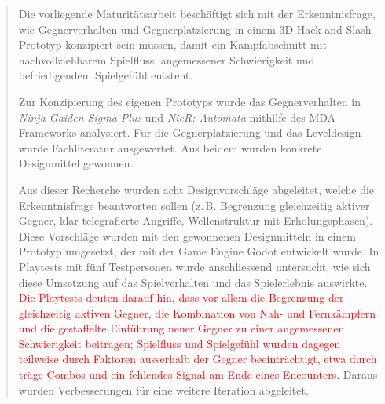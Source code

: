 \documentclass[10pt]{article}
\newcommand{\game}[1]{\textit{#1}}   %
\begin{document}
\begin{abstract}
    Die vorliegende Maturitätsarbeit beschäftigt sich mit der Erkenntnisfrage, wie Gegnerverhalten und Gegnerplatzierung in einem 3D-Hack-and-Slash-Prototyp konzipiert sein müssen, damit ein Kampfabschnitt mit nachvollziehbarem Spielfluss, angemessener Schwierigkeit und befriedigendem Spielgefühl entsteht.

    Zur Konzipierung des eigenen Prototyps wurde das Gegnerverhalten in \game{Ninja Gaiden Sigma Plus} und \game{NieR: Automata} mithilfe des MDA-Frameworks analysiert. Für die Gegnerplatzierung und das Leveldesign wurde Fachliteratur ausgewertet. Aus beidem wurden konkrete Designmittel gewonnen.

    Aus dieser Recherche wurden acht Designvorschläge abgeleitet, welche die Erkenntnisfrage beantworten sollen (z.\,B. Begrenzung gleichzeitig aktiver Gegner, klar telegrafierte Angriffe, Wellenstruktur mit Erholungsphasen). Diese Vorschläge wurden mit den gewonnenen Designmitteln in einem Prototyp umgesetzt, der mit der Game Engine Godot entwickelt wurde. In Playtests mit fünf Testpersonen wurde anschliessend untersucht, wie sich diese Umsetzung auf das Spielverhalten und das Spielerlebnis auswirkte. \textcolor{red}{Die Playtests deuten darauf hin, dass vor allem die Begrenzung der gleichzeitig aktiven Gegner, die Kombination von Nah- und Fernkämpfern und die gestaffelte Einführung neuer Gegner zu einer angemessenen Schwierigkeit beitragen; Spielfluss und Spielgefühl wurden dagegen teilweise durch Faktoren ausserhalb der Gegner beeinträchtigt, etwa durch träge Combos und ein fehlendes Signal am Ende eines Encounters.} Daraus wurden Verbesserungen für eine weitere Iteration abgeleitet.
\end{abstract}

\newpage


\tableofcontents

\newpage



\newpage


\newpage


\newpage


\newpage


\newpage


\newpage


\newpage


\newpage


\newpage
\end{document}
